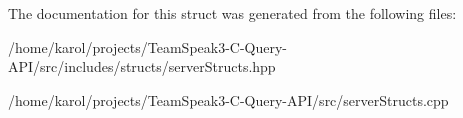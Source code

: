 The documentation for this struct was generated from the following files\+:\begin{DoxyCompactItemize}
\item 
/home/karol/projects/\+Team\+Speak3-\/\+C-\/\+Query-\/\+A\+P\+I/src/includes/structs/server\+Structs.\+hpp\item 
/home/karol/projects/\+Team\+Speak3-\/\+C-\/\+Query-\/\+A\+P\+I/src/server\+Structs.\+cpp\end{DoxyCompactItemize}
